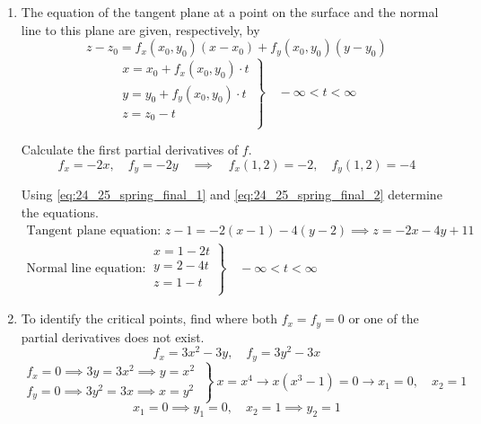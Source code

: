 \documentclass[a4paper, 12pt]{article}
\begin{document}
\begin{enumerate}[leftmargin=*,label=\textbf{\arabic*.}]
\item The equation of the tangent plane at a point on the surface and the normal line to this plane are given, respectively, by
\begin{equation}z-z_0=f_x(x_0,y_0)(x-x_0)+f_y(x_0,y_0)(y-y_0)\label{eq:24_25_spring_final_1}\end{equation}
\begin{equation}
\left.\begin{array}{c}
x=x_0+f_x(x_0,y_0)\cdot t\\
y=y_0+f_y(x_0,y_0)\cdot t\\
z=z_0- t\\
\end{array}\right\}\quad-\infty<t<\infty\label{eq:24_25_spring_final_2}
\end{equation}

Calculate the first partial derivatives of $f$.
\[f_x=-2x,\quad f_y=-2y\quad\implies\quad f_x(1,2)=-2,\quad f_y(1,2)=-4\]

Using \eqref{eq:24_25_spring_final_1} and \eqref{eq:24_25_spring_final_2} determine the equations.
\[\boxed{\begin{array}{l}
\text{Tangent plane equation: } z-1=-2(x-1)-4(y-2)\implies z=-2x-4y+11\\
\text{Normal line equation:}\:\left.\begin{array}{l}
x=1-2t\\
y=2-4t\\
z=1-t\\
\end{array}\right\}\quad-\infty<t<\infty
\end{array}
}
\]

\item To identify the critical points, find where both $f_x=f_y=0$ or one of the partial derivatives does not exist.
\vspace{-1em} %
\[f_x=3x^2-3y,\quad f_y=3y^2-3x\]
\[\left.\begin{array}{c}
f_x=0\implies 3y=3x^2\implies y=x^2\\
f_y=0\implies 3y^2=3x\implies x=y^2 
\end{array}\:\right\}\: x=x^4\rightarrow x(x^3-1)=0\rightarrow x_1=0,\quad x_2=1\]
\[x_1=0\implies y_1=0,\quad x_2=1\implies y_2=1\]


\end{enumerate}
\end{document}
